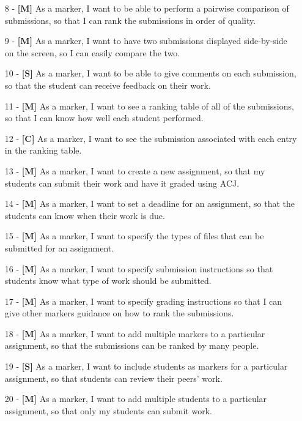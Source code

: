 \documentclass{l4proj}
\begin{document}
\begin{itemize}
    \item
        [8] - \textbf{[M]} As a marker, I want to be able to perform a pairwise comparison of submissions, so that I can rank the submissions in order of quality.
    \item
        [9] - \textbf{[M]} As a marker, I want to have two submissions displayed side-by-side on the screen, so I can easily compare the two.
    \item
        [10] - \textbf{[S]} As a marker, I want to be able to give comments on each submission, so that the student can receive feedback on their work.
    \item
        [11] - \textbf{[M]} As a marker, I want to see a ranking table of all of the submissions, so that I can know how well each student performed.
    \item
        [12] - \textbf{[C]} As a marker, I want to see the submission associated with each entry in the ranking table.
    \item
        [13] - \textbf{[M]} As a marker, I want to create a new assignment, so that my students can submit their work and have it graded using ACJ.
    \item
        [14] - \textbf{[M]} As a marker, I want to set a deadline for an assignment, so that the students can know when their work is due.
    \item
        [15] - \textbf{[M]} As a marker, I want to specify the types of files that can be submitted for an assignment.
    \item
        [16] - \textbf{[M]} As a marker, I want to specify submission instructions so that students know what type of work should be submitted.
    \item
        [17] - \textbf{[M]} As a marker, I want to specify grading instructions so that I can give other markers guidance on how to rank the submissions.
    \item
        [18] - \textbf{[M]} As a marker, I want to add multiple markers to a particular assignment, so that the submissions can be ranked by many people.
    \item
        [19] - \textbf{[S]} As a marker, I want to include students as markers for a particular assignment, so that students can review their peers' work.
    \item
        [20] - \textbf{[M]} As a marker, I want to add multiple students to a particular assignment, so that only my students can submit work.
    
\end{itemize}
\end{document}
